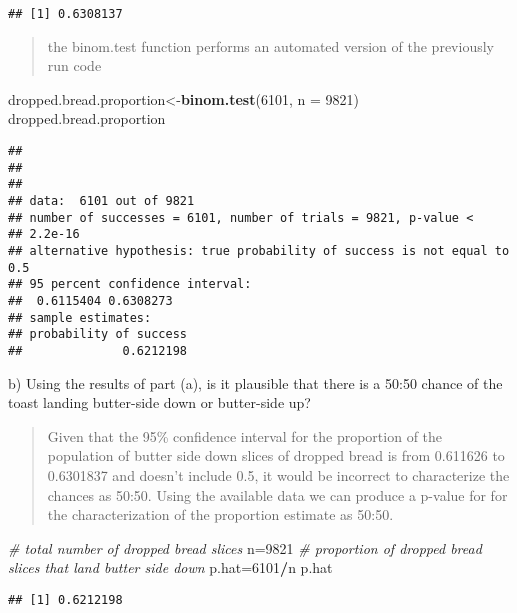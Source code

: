 \documentclass[ignorenonframetext,]{beamer}
\newenvironment{Shaded}{\begin{snugshade}}{\end{snugshade}}
\newcommand{\KeywordTok}[1]{\textcolor[rgb]{0.13,0.29,0.53}{\textbf{#1}}}
\newcommand{\DataTypeTok}[1]{\textcolor[rgb]{0.13,0.29,0.53}{#1}}
\newcommand{\DecValTok}[1]{\textcolor[rgb]{0.00,0.00,0.81}{#1}}
\newcommand{\CommentTok}[1]{\textcolor[rgb]{0.56,0.35,0.01}{\textit{#1}}}
\newcommand{\OperatorTok}[1]{\textcolor[rgb]{0.81,0.36,0.00}{\textbf{#1}}}
\newcommand{\NormalTok}[1]{#1}
\begin{document}
\begin{frame}[fragile]
\begin{verbatim}
## [1] 0.6308137
\end{verbatim}

\begin{quote}
the binom.test function performs an automated version of the previously
run code
\end{quote}

\begin{Shaded}
\begin{Highlighting}[]
\NormalTok{dropped.bread.proportion<-}\KeywordTok{binom.test}\NormalTok{(}\DecValTok{6101}\NormalTok{, }\DataTypeTok{n =} \DecValTok{9821}\NormalTok{)}
\NormalTok{dropped.bread.proportion}
\end{Highlighting}
\end{Shaded}

\begin{verbatim}
## 
## 
## 
## data:  6101 out of 9821
## number of successes = 6101, number of trials = 9821, p-value <
## 2.2e-16
## alternative hypothesis: true probability of success is not equal to 0.5
## 95 percent confidence interval:
##  0.6115404 0.6308273
## sample estimates:
## probability of success 
##              0.6212198
\end{verbatim}

\begin{block}{b) Using the results of part (a), is it plausible that
there is a 50:50 chance of the toast landing butter-side down or
butter-side up?}

\begin{quote}
Given that the 95\% confidence interval for the proportion of the
population of butter side down slices of dropped bread is from 0.611626
to 0.6301837 and doesn't include 0.5, it would be incorrect to
characterize the chances as 50:50. Using the available data we can
produce a p-value for for the characterization of the proportion
estimate as 50:50.
\end{quote}

\begin{Shaded}
\begin{Highlighting}[]
\CommentTok{# total number of dropped bread slices}
\NormalTok{n=}\DecValTok{9821}
\CommentTok{# proportion of dropped bread slices that land butter side down}
\NormalTok{p.hat=}\DecValTok{6101}\OperatorTok{/}\NormalTok{n}
\NormalTok{p.hat}
\end{Highlighting}
\end{Shaded}

\begin{verbatim}
## [1] 0.6212198
\end{verbatim}


\end{block}
\end{frame}
\end{document}
